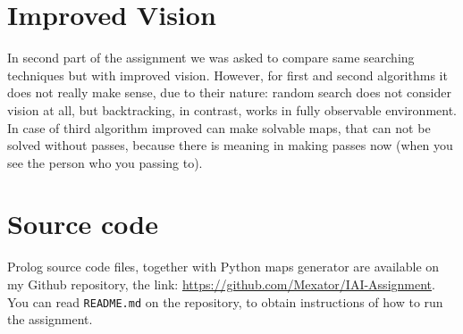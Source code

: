 \documentclass[a4paper,12pt]{article}
\begin{document}
    \section{Improved Vision}
    In second part of the assignment we was asked to compare same searching techniques  
    but with improved vision. However, for first and second algorithms it does 
    not really make sense, due to their nature: random search does not consider 
    vision at all, but backtracking, in contrast, works in fully observable environment.\\
    In case of third algorithm improved can make solvable maps, that can not be solved 
    without passes, because there is meaning in making passes now (when you see
    the person who you passing to).
    \section{Source code}
    Prolog source code files, together with Python maps generator are available
    on my Github repository, the link: \href{https://github.com/Mexator/IAI-Assignment}
    {https://github.com/Mexator/IAI-Assignment}.\\
    You can read \texttt{README.md} on the repository, to obtain instructions of 
    how to run the assignment.
\end{document}
